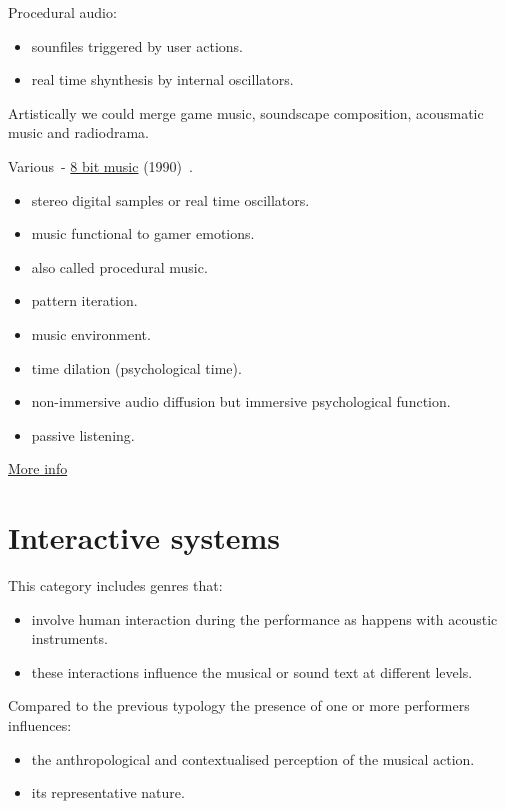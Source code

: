 Procedural audio:

\begin{itemize}
\tightlist\item sounfiles triggered by user actions.
\item real time shynthesis by internal oscillators.
\end{itemize}

Artistically we could merge game music, soundscape composition, acousmatic music and radiodrama.

Various~- \href{http://www.musicaecodice.it/on_server/media/2_media/gaming.mp3}{8 bit music} (1990)~\cite{otto}.

\begin{itemize}
\tightlist\item stereo digital samples or real time oscillators.
\item music functional to gamer emotions.
\item also called procedural music.
\item pattern iteration.
\item music environment.
\item time dilation (psychological time).
\item non-immersive audio diffusion but immersive psychological function.
\item passive listening.
\end{itemize}

\href{http://www.musicaecodice.it/on_server/media/2_media/gaming.pdf}{More info}

\section{Interactive systems }\label{interactive-systems}

This category includes genres that:

\begin{itemize}
\tightlist\item involve human interaction during the performance as happens with acoustic instruments.
\item these interactions influence the musical or sound text at different levels.
\end{itemize}

Compared to the previous typology the presence of one or more performers influences:

\begin{itemize}
\tightlist\item the anthropological and contextualised perception of the musical action.
\item its representative nature.
\end{itemize}


